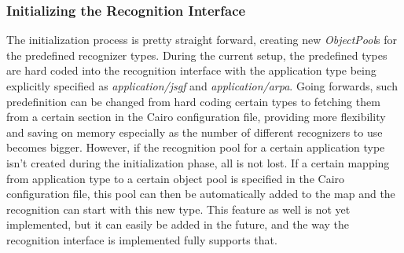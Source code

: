 

\subsubsection{Initializing the Recognition Interface}
The initialization process is pretty straight forward, creating new \textit{ObjectPool}s for the predefined recognizer types.
During the current setup, the predefined types are hard coded into the recognition interface with the application type being explicitly specified as \textit{application/jsgf} and \textit{application/arpa}.
Going forwards, such predefinition can be changed from hard coding certain types to fetching them from a certain section in the Cairo configuration file, providing more flexibility and saving on memory especially as the number of different recognizers to use becomes bigger.
However, if the recognition pool for a certain application type isn't created during the initialization phase, all is not lost.
If a certain mapping from application type to a certain object pool is specified in the Cairo configuration file, this pool can then be automatically added to the map and the recognition can start with this new type.
This feature as well is not yet implemented, but it can easily be added in the future, and the way the recognition interface is implemented fully supports that.


